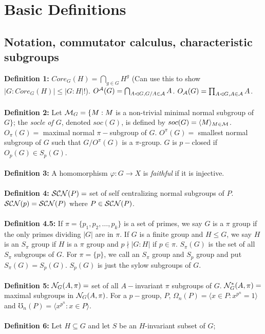 \chapter{Basic Definitions}
\section{Notation, commutator calculus, characteristic subgroups}
{\bf Definition 1:}
$Core_G(H)= \bigcap_{g \in G} H^g$ (Can use this to show $|G:Core_G(H)|\le |G:H|!$).
$O^{\cal A}(G)= \bigcap_{A \lhd G, G/A \in {\cal A}} A$.
$O_{\cal A}(G)= \prod_{A \lhd G, A \in {\cal A}} A$.\\
\\
{\bf Definition 2:} Let ${\cal M}_G= \{ M: M$ is a non-trivial minimal normal subgroup of $G\}$;
the \emph{socle of $G$}, denoted
$soc(G)$, is defined by
$soc(G)= \langle M \rangle_{M \in {\cal M}}$.
$O_{\pi}(G)=$ maximal normal $\pi-$subgroup of $G$.
$O^{\pi}(G)=$ smallest normal subgroup of $G$ such that $G/O^{\pi}(G)$ is a $\pi$-group.
$G$ is $p-$closed if $O_p(G) \in S_p(G)$.
\\
\\
{\bf Definition 3:}
A homomorphism $\varphi: G \rightarrow X$ is \emph {faithful} if it is injective.
\\
\\
{\bf Definition 4:}
${\cal SCN}(P)=$ set of self centralizing normal subgroups of $P$.
${\cal SCN}(p)= {\cal SCN}(P)$ where $P \in {\cal SCN}(P)$.
\\
\\
{\bf Definition 4.5:} If $\pi = \{ p_1, p_2, \ldots , p_k\}$ is a set of primes, we say
$G$ is a $\pi$ group if the only primes dividing $|G|$ are in $\pi$.  If $G$ is a finite
group and $H \leq G$, we say $H$ is an $S_{\pi}$ group if $H$ is a $\pi$ group and 
$p \nmid |G:H|$  if $p \in \pi$.  $S_{\pi}(G)$  is the set of all $S_{\pi}$ subgroups of
$G$. For $\pi = \{ p \}$, we call an $S_{\pi}$ group and $S_p$ group and put $S_{\pi}(G) = S_p(G)$.
$S_p(G)$ is just the sylow subgroups of $G$.
\\
\\
{\bf Definition 5:}
${\cal N}_G(A, \pi)=$ set of all $A-$invariant $\pi$ subgroups of $G$.
${\cal N}_G^*(A, \pi)=$ maximal subgroups in ${\cal N}_G(A, \pi)$.  For a $p-$group, $P$,
$\Omega_n(P)= 
\langle x \in P: x^{p^n}=1 \rangle $ and
$\mho_n(P)= \langle x^{p^n}: x \in P \rangle $.
\\
\\
{\bf Definition 6:} Let $H \subseteq G$ and let $S$ be an $H$-invariant subset of $G$;
